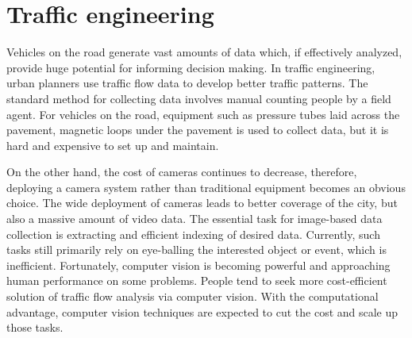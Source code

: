 \section{Traffic engineering}
\label{sec:intro-its}

Vehicles on the road generate vast amounts of data which, if effectively analyzed, provide huge potential for informing decision making.
In traffic engineering, urban planners use traffic flow data to develop better traffic patterns.
The standard method for collecting data involves manual counting people by a field agent.
For vehicles on the road, equipment such as pressure tubes laid across the pavement, magnetic loops under the pavement \cite{klein2006traffic,mimbela2000summary} is used to collect data, but it is hard and expensive to set up and maintain.

On the other hand, the cost of cameras continues to decrease, therefore, deploying a camera system rather than traditional equipment becomes an obvious choice.
The wide deployment of cameras leads to better coverage of the city, but also a massive amount of video data.
The essential task for image-based data collection is extracting and efficient indexing of desired data.
Currently, such tasks still primarily rely on eye-balling the interested object or event, which is inefficient.
Fortunately, computer vision is becoming powerful and approaching human performance on some problems.
People tend to seek more cost-efficient solution of traffic flow analysis via computer vision.
With the computational advantage, computer vision techniques are expected to cut the cost and scale up those tasks.